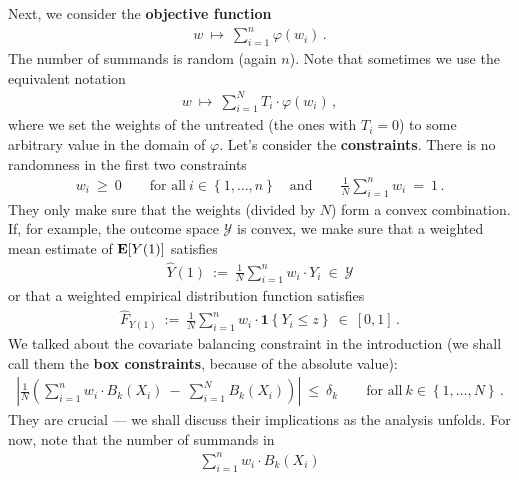 Next, we consider the \textbf{objective function}
\begin{gather*}
  w
  \ 
  \mapsto
  \ 
    \sum_{i = 1}^{n} 
    \varphi(w_i)
    \,.
\end{gather*}
The number of summands is random (again $n$).
Note that sometimes we use the equivalent notation
\begin{gather*}
  w
  \ 
  \mapsto
  \ 
    \sum_{i = 1}^{N} 
    T_i
    \cdot
    \varphi(w_i)
    \,,
\end{gather*}
where we set the weights of the untreated (the ones with $T_i=0$) to some arbitrary value in the domain of $\varphi$.
Let's consider the \textbf{constraints}. There is no randomness in the first two constraints
\begin{gather*}
    w_i 
    \ 
    \ge
    \ 
    0
    \qquad
    \text{for all}\ 
    i \in \left\{ 1, \ldots, n \right\}
    \quad
    \text{and}
    \qquad
    \frac{1}{N}
    \sum_{i=1}^{n} 
    w_i
    \ 
    =
    \ 
    1
    \,.
\end{gather*}
They only make sure that the weights (divided by $N$) form a convex combination.
If, for example, the outcome space $\mathcal{Y}$ is convex, we make sure that a weighted mean estimate of $\mathbf{E}[Y(1)]$ satisfies
\begin{gather*}
  \widehat{Y}(1) 
  \ 
  :=
  \ 
  \frac{1}{N}
  \sum_{i=1}^{n} 
  w_i\cdot Y_i
  \ 
  \in
  \ 
  \mathcal{Y}
\end{gather*}
or that a weighted empirical distribution function satisfies
\begin{gather*}
  \widehat{F}_{Y(1)} 
  \ 
  :=
  \ 
  \frac{1}{N}
  \sum_{i=1}^{n} 
  w_i\cdot \mathbf{1}\left\{ Y_i\le z \right\}
  \ 
  \in
  \ 
  [0,1]
  \,.
\end{gather*}
We talked about the covariate balancing constraint
in the introduction
(we shall call them the \textbf{box constraints}, because of the absolute value):
\begin{gather*}
    \left| 
      \frac{1}{N} 
      \left( 
      \sum_{i = 1}^{n} 
      w_i
      \cdot
      B_k(X_i)
      \ 
      -
      \ 
      \sum_{i=1}^{N} 
      B_k(X_i)
      \right)
    \right|
    \ 
    \le 
    \ 
    \delta_k
    \qquad
    \text{for all}\ 
    k \in \left\{ 1, \ldots, N\right\}
    \,.
\end{gather*}
They are crucial --- we shall discuss their implications as the analysis unfolds.
For now, note that the number of summands in
\begin{gather*}
      \sum_{i = 1}^{n} 
      w_i
      \cdot
      B_k(X_i)
\end{gather*}
